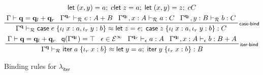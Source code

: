 \documentclass[acmsmall,screen,review]{acmart}
\newcommand{\mc}[1]{\ensuremath{\mathcal{#1}}}
\newcommand{\mb}[1]{\ensuremath{\mathbf{#1}}}
\newcommand{\ms}[1]{\ensuremath{\mathsf{#1}}}
\newcommand{\lto}{:}
\newcommand{\linl}[1]{\iota_l\;{#1}}
\newcommand{\linr}[1]{\iota_r\;{#1}}
\newcommand{\letexpr}[3]{\ensuremath{\ms{let}\;#1 = #2;\;#3}}
\newcommand{\caseexpr}[5]{\ms{case}\;#1\;\{\linl{#2} \lto #3, \linr{#4} \lto #5\}}
\newcommand{\liter}[3]{\ms{iter}\;#1\;\{ \linr{#2} \lto #3 \}}
\newcommand{\einf}[1]{#1 \in \mc{E}^\infty}
\newcommand{\qsp}[4]{#1 \vdash #2 = #3 + #4}
\newcommand{\rle}[1]{{\scriptsize\textsf{#1}}}
\newcommand{\hasty}[4]{#1 \vdash_{#2} #3: {#4}}
\newcommand{\teqv}{\approx}
\newcommand{\tmeq}[5]{#1 \vdash_{#2} #3 \teqv #4 : {#5}}
\newcommand{\subiterexp}{\texorpdfstring{\(\lambda_{\ms{iter}}\)}{lambda-iter}}
\newcommand{\alquant}{\ms{q}}
\begin{document}
\begin{figure}
\begin{gather*}
{          {\letexpr{(x, y)}{a}{c}}
          {\letexpr{z}{a}{\letexpr{(x, y)}{z}{c}}}
          {C}
      } \\
    \prftree[r]{\rle{case-bind}}
      {\qsp{\Gamma}{\mb{q}}{\mb{q}_l}{\mb{q}_r}}
      {\hasty{\Gamma^{\mb{q}_r}}{\mc{R}}{e}{A + B}}
      {\hasty{\Gamma^{\mb{q}_l}, x : A}{\mc{R}}{a}{C}}
      {\hasty{\Gamma^{\mb{q}_l}, y : B}{\mc{R}}{b}{C}}
      {
        \tmeq{\Gamma^{\mb{q}}}{\mc{R}}
        {\caseexpr{e}{x}{a}{y}{b}}
        {\letexpr{z}{e}{\caseexpr{z}{x}{a}{y}{b}}}
        {C}
      } \\
    \prftree[r]{\rle{iter-bind}}
      {\qsp{\Gamma}{\mb{q}}{\mb{q}_l}{\mb{q}_r}}
      {\alquant(\Gamma^{\mb{q}_l}) = \top}
      {\einf{\epsilon}}
      {\hasty{\Gamma^{\mb{q}_r}}{\epsilon}{a}{A}}
      {\hasty{\Gamma^{\mb{q}_l}, x : A}{\epsilon}{b}{B + A}}
      {\tmeq{\Gamma^{\mb{q}}}{\mc{R}}{\liter{a}{x}{b}}{\letexpr{y}{a}{\liter{y}{x}{b}}}{B}}
  \end{gather*}
  \caption{Binding rules for \subiterexp{}}
  \Description{}
  \label{fig:binding-rules}
\end{figure}
\end{document}
